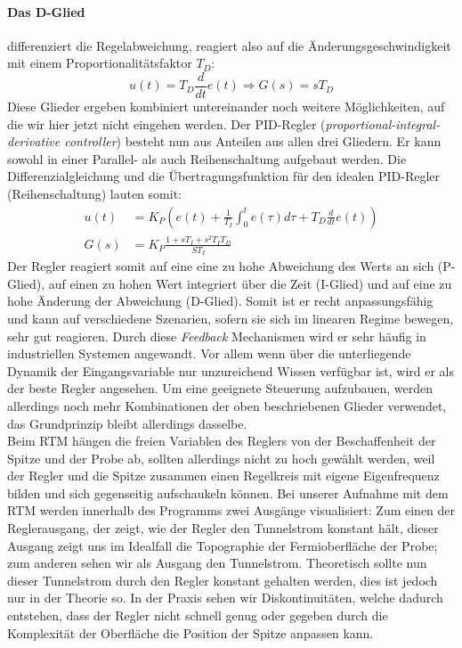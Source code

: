 \paragraph{Das D-Glied} differenziert die Regelabweichung, reagiert also auf die
Änderungsgeschwindigkeit mit einem Proportionalitätsfaktor $T_D$:
\begin{equation}
u(t) = T_D \frac{d}{dt}e(t) \Rightarrow G(s) = s T_D
\end{equation}
Diese Glieder ergeben kombiniert untereinander noch weitere Möglichkeiten, auf die wir 
hier jetzt nicht eingehen werden. 
Der PID-Regler (\textit{proportional-integral-derivative controller}) besteht nun aus Anteilen
aus allen drei Gliedern. Er kann sowohl in einer Parallel- als auch Reihenschaltung aufgebaut 
werden. Die Differenzialgleichung und die Übertragungsfunktion
für den idealen PID-Regler (Reihenschaltung) lauten somit:
\begin{align}
u(t) &= K_P \left( e(t) + \frac{1}{T_I} \int_{0}^{t} e(\tau) d\tau + T_D \frac{d}{dt} e(t) \right)\\
G(s) &= K_P \frac{1 + s T_I + s^2 T_I T_D}{S T_I}
\end{align}
Der Regler reagiert somit auf eine eine zu hohe Abweichung des Werts an sich (P-Glied), auf einen
zu hohen Wert integriert über die Zeit (I-Glied) und auf eine zu hohe Änderung der Abweichung 
(D-Glied). Somit ist er recht anpassungsfähig und kann auf verschiedene Szenarien, sofern sie sich
im linearen Regime bewegen, sehr gut reagieren. Durch diese \textit{Feedback} Mechanismen wird
er sehr häufig in industriellen Systemen angewandt. Vor allem wenn über die unterliegende
Dynamik der Eingangsvariable nur unzureichend Wissen verfügbar ist, wird er als der beste 
Regler angesehen. Um eine geeignete Steuerung aufzubauen, werden allerdings noch mehr Kombinationen
der oben beschriebenen Glieder verwendet, das Grundprinzip bleibt allerdings dasselbe.\\
Beim RTM hängen die freien Variablen des Reglers von der Beschaffenheit der Spitze und der Probe 
ab, sollten allerdings nicht zu hoch gewählt werden, weil der Regler und die Spitze zusammen
einen Regelkreis mit eigene Eigenfrequenz bilden und sich gegenseitig aufschaukeln können.
Bei unserer Aufnahme mit dem RTM werden innerhalb des Programms zwei Ausgänge visualisiert:
Zum einen der Reglerausgang, der zeigt, wie der Regler den Tunnelstrom konstant hält, dieser
Ausgang zeigt uns im Idealfall die Topographie der Fermioberfläche der Probe; zum anderen sehen
wir als Ausgang den Tunnelstrom. Theoretisch sollte nun dieser Tunnelstrom durch den Regler 
konstant gehalten werden, dies ist jedoch nur in der Theorie so. In der Praxis sehen wir 
Diskontinuitäten, welche dadurch entstehen, dass der Regler nicht schnell genug oder gegeben
durch die Komplexität der Oberfläche die Position der Spitze anpassen kann. 
